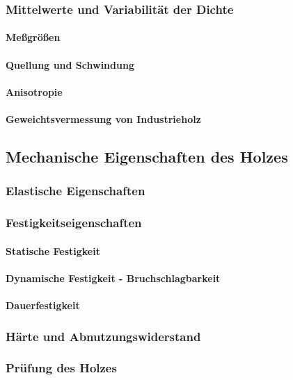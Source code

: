 \documentclass{article}
\begin{document}
     
  

\subsubsection{Mittelwerte und Variabilität der Dichte}


\paragraph{Meßgrößen}
\paragraph{Quellung und Schwindung}
\paragraph{Anisotropie}
\paragraph{Geweichtsvermessung von Industrieholz}
\subsection{Mechanische Eigenschaften des Holzes}
\subsubsection{Elastische Eigenschaften}
\subsubsection{Festigkeitseigenschaften}
\paragraph{Statische Festigkeit}
\paragraph{Dynamische Festigkeit - Bruchschlagbarkeit}
\paragraph{Dauerfestigkeit}
\subsubsection{Härte und Abnutzungswiderstand}
\subsubsection{Prüfung des Holzes}
\end{document}
